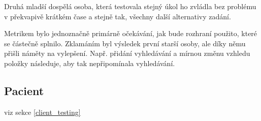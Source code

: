 Druhá mladší dospělá osoba, která testovala stejný úkol ho zvládla bez problému v překvapivě krátkém čase a stejně tak, všechny další alternativy zadání.
 
Metrikem bylo jednoznačně primárně očekávání, jak bude rozhraní použito, které se částečně splnilo. Zklamáním byl výsledek první starší osoby, ale díky němu přišli náměty na vylepšení. Např. přidání vyhledávání a mírnou změnu vzhledu položky následuje, aby tak nepřipomínala vyhledávání. 

\subsection{Pacient}
viz sekce \ref{client_testing}
